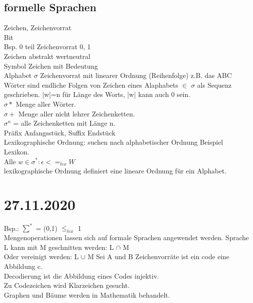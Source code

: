 \documentclass{article}
\begin{document}
	\subsection*{formelle Sprachen}
	Zeichen, Zeichenvorrat \\
	Bit \\
	Bsp. 0 teil Zeichenvorrat 0, 1 \\
	Zeichen abstrakt wertneutral \\
	Symbol Zeichen mit Bedeutung \\
	Alphabet $\sigma$ Zeichenvorrat mit linearer Ordnung (Reihenfolge) z.B. das ABC \\
	Wörter sind endliche Folgen von Zeichen eines Alaphabets $\in$ $\sigma$ als Sequenz geschrieben. |w|=n für Länge des Worts, |w| kann auch 0 sein.\\
	$\sigma*$ Menge aller Wörter. \\
	$\sigma+$ Menge aller nicht lehrer Zeichenketten. \\
	$\sigma^{n}$ = alle Zeichenketten mit Länge n. \\
	Präfix Anfangsstück, Suffix Endstück \\
	Lexikographische Ordnung: suchen nach alphabetischer Ordnung Beispiel Lexikon. \\

	Alle $w \in \sigma^{*} : \epsilon <=_{lex} W$  \\
	
	lexikographische Ordnung definiert eine lineare Ordnung für ein Alphabet.
	
	\section*{27.11.2020}
	Bsp.: $\sum^*$ = (0,1) $\leq_{lex}$ 1 \\
	Mengenoperationen lassen sich auf formale Sprachen angewendet werden.
	Sprache L kann mit M geschnitten werden: L $\cap$ M \\
	Oder vereinigt werden: L $\cup$ M
	Sei A und B Zeichenvorräte ist ein code eine Abbildung c. \\
	Decodierung ist die Abbildung eines Codes injektiv. \\
	Zu Codezeichen wird Klarzeichen gesucht. \\
	Graphen und Bäume werden in Mathematik behandelt. \\
	
\end{document}
